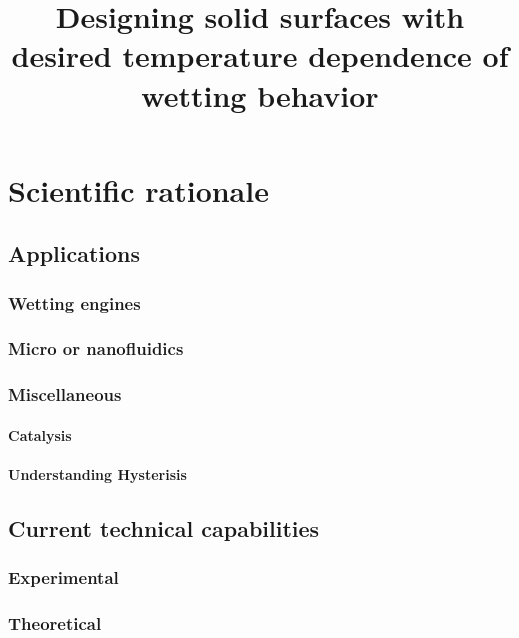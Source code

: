 \documentclass[a4paper,12pt,single,pdftex]{scrartcl}
\title{Designing solid surfaces with desired temperature dependence of wetting behavior}
\begin{document}
 
\maketitle
\newpage

\label{ID_1723255651}\label{ID_268635931}\section{Scientific rationale}

\label{ID_1616607157}\subsection{Applications}

\label{ID_564676847}\subsubsection{Wetting engines}

\label{ID_1321830436}\subsubsection{Micro or nanofluidics}

\label{ID_278738019}\subsubsection{Miscellaneous}

\label{ID_1903445769}\paragraph{Catalysis}

\label{ID_731793233}\paragraph{Understanding Hysterisis}

\label{ID_235950698}\subsection{Current technical capabilities}

\label{ID_1442355972}\subsubsection{Experimental}

\label{ID_474314366}\subsubsection{Theoretical}
\end{document}
